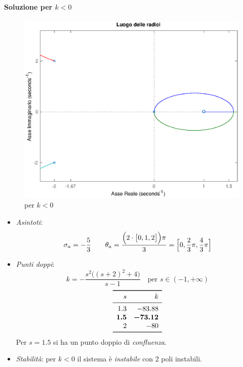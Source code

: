 \paragraph{Soluzione per \(k<0\)}

\begin{figure}[ht]
	\centering
	\includegraphics[scale=.5]{mod1/assets/rl_ex311n}
	\caption{per \(k<0\)}
\end{figure}

\begin{itemize}
	\item \emph{Asintoti}:
		\[
			\sigma_a = -\frac{5}{3} \qquad
			\theta_a = \frac{\Bigl(2\cdot\bigl[0,1,2\bigr]\Bigr)\pi}{3} = \Bigl[0,\frac{2}{3}\pi,\frac{4}{3}\pi\Bigr]
		\]
	\item \emph{Punti doppi}:
		\[
			k = -\frac{s^2\bigl((s+2)^2+4\bigr)}{s-1} \quad
			\text{per } s \in (-1,+\infty)
		\]
		\[\begin{array}{rr}
			\toprule
			s 	 & k 		\\
			\midrule
			1.3 	 & -83.88 	\\
			\bm{1.5} & \bm{-73.12} \\
			2 	 & -80 		\\
			\bottomrule
		\end{array}\]
		Per \(s=1.5\) si ha un punto doppio di \emph{confluenza}.
	\item \emph{Stabilità}: per \(k<0\) il sistema è \emph{instabile} con
		2 poli instabili.
\end{itemize}


